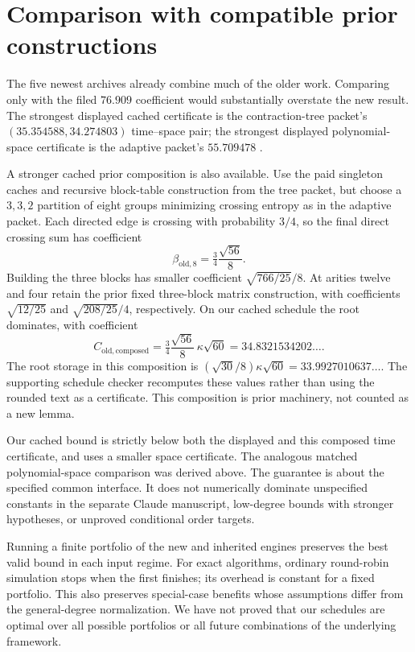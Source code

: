 \documentclass[11pt,letterpaper]{article}
\theoremstyle{remark}\newtheorem{remark}[theorem]{Remark}
\begin{document}
\section{Comparison with compatible prior constructions}
\label{sec:comparison}

The five newest archives already combine much of the older work. Comparing
only with the filed $76.909$ coefficient would substantially overstate
the new result. The strongest displayed cached certificate is the
contraction-tree packet's $(35.354588,34.274803)$ time--space pair; the
strongest displayed polynomial-space certificate is the adaptive packet's
$55.709478$ \cite{tree,adaptive}.

A stronger cached prior composition is also available. Use the paid
singleton caches and recursive block-table construction from the tree
packet, but choose a $3,3,2$ partition of eight groups minimizing crossing
entropy as in the adaptive packet. Each directed edge is crossing with
probability $3/4$, so the final direct crossing sum has coefficient
\[
 \beta_{\mathrm{old},8}=\tfrac34\frac{\sqrt{56}}8.
\]
Building the three blocks has smaller coefficient
$\sqrt{766/25}/8$. At arities twelve and four retain the prior fixed
three-block matrix construction, with coefficients $\sqrt{12/25}$ and
$\sqrt{208/25}/4$, respectively. On our cached schedule the root
dominates, with coefficient
\[
 C_{\mathrm{old,composed}}=
 \tfrac34\frac{\sqrt{56}}8\,\kappa\sqrt{60}
 =34.8321534202\ldots .
\]
The root storage in this composition is
$(\sqrt{30}/8)\kappa\sqrt{60}=33.9927010637\ldots$.
The supporting schedule checker recomputes these values rather than using
the rounded text as a certificate. This composition is prior machinery,
not counted as a new lemma.

Our cached bound is strictly below both the displayed and this composed
time certificate, and uses a smaller space certificate. The analogous
matched polynomial-space comparison was derived above. The guarantee is
about the specified common interface. It does not numerically dominate
unspecified constants in the separate Claude manuscript, low-degree bounds
with stronger hypotheses, or unproved conditional order targets.

Running a finite portfolio of the new and inherited engines preserves
the best valid bound in each input regime. For exact algorithms, ordinary
round-robin simulation stops when the first finishes; its overhead is
constant for a fixed portfolio. This also preserves special-case benefits
whose assumptions differ from the general-degree normalization. We have
not proved that our schedules are optimal over all possible portfolios or
all future combinations of the underlying framework.
\end{document}
